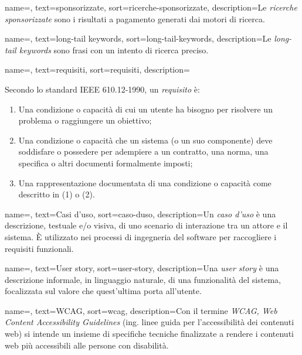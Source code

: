  {
    name=,
    text=sponsorizzate,
    sort=ricerche-sponsorizzate,
    description={Le \emph{ricerche sponsorizzate} sono i risultati a pagamento generati dai motori di ricerca.}
}

 {
    name=,
    text=long-tail keywords,
    sort=long-tail-keywords,
    description={Le \emph{long-tail keywords} sono frasi con un intento di ricerca preciso.}
}

 {
    name=,
    text=requisiti,
    sort=requisiti,
    description={Secondo lo standard IEEE 610.12-1990, un \emph{requisito} è:
    \begin{enumerate}
        \item Una condizione o capacità di cui un utente ha bisogno per risolvere un problema o raggiungere un obiettivo;
        \item Una condizione o capacità che un sistema (o un suo componente) deve soddisfare o possedere per adempiere a un contratto, una norma, una specifica o altri documenti formalmente imposti;
        \item Una rappresentazione documentata di una condizione o capacità come descritto in (1) o (2).
    \end{enumerate}
    }
}

 {
    name=,
    text=Casi d'uso,
    sort=caso-duso,
    description={Un \emph{caso d'uso} è una descrizione, testuale e/o visiva, di uno scenario di interazione tra un attore e il sistema. È utilizzato nei processi di ingegneria del software per raccogliere i requisiti funzionali.}
}

 {
    name=,
    text=User story,
    sort=user-story,
    description={Una \emph{user story} è una descrizione informale, in linguaggio naturale, di una funzionalità del sistema, focalizzata sul valore che quest'ultima porta all'utente.}
}

 {
    name=,
    text=WCAG,
    sort=wcag,
    description={Con il termine \emph{WCAG, Web Content Accessibility Guidelines} (ing. linee guida per l'accessibilità dei contenuti web) si intende un insieme di specifiche tecniche finalizzate a rendere i contenuti web più accessibili alle persone con disabilità.}
}

